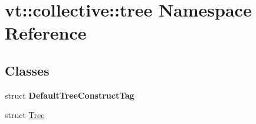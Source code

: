 \hypertarget{namespacevt_1_1collective_1_1tree}{}\section{vt\+:\+:collective\+:\+:tree Namespace Reference}
\label{namespacevt_1_1collective_1_1tree}
\subsection*{Classes}
\begin{DoxyCompactItemize}
\item 
struct {\bfseries Default\+Tree\+Construct\+Tag}
\item 
struct \hyperlink{structvt_1_1collective_1_1tree_1_1_tree}{Tree}
\end{DoxyCompactItemize}
